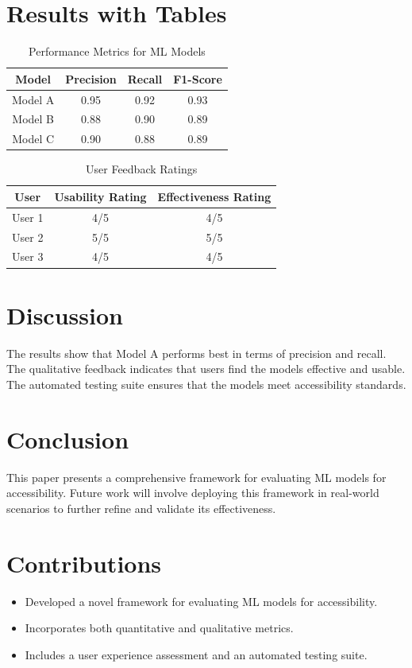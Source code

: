 \documentclass{article}
\begin{document}
\section{Results with Tables}
\begin{table}[ht]
    \centering
    \begin{tabular}{|c|c|c|c|}
        \hline
        Model & Precision & Recall & F1-Score \\
        \hline
        Model A & 0.95 & 0.92 & 0.93 \\
        Model B & 0.88 & 0.90 & 0.89 \\
        Model C & 0.90 & 0.88 & 0.89 \\
        \hline
    \end{tabular}
    \caption{Performance Metrics for ML Models}
    \label{tab:metrics}
\end{table}

\begin{table}[ht]
    \centering
    \begin{tabular}{|c|c|c|}
        \hline
        User & Usability Rating & Effectiveness Rating \\
        \hline
        User 1 & 4/5 & 4/5 \\
        User 2 & 5/5 & 5/5 \\
        User 3 & 4/5 & 4/5 \\
        \hline
    \end{tabular}
    \caption{User Feedback Ratings}
    \label{tab:userfeedback}
\end{table}

\section{Discussion}
The results show that Model A performs best in terms of precision and recall. The qualitative feedback indicates that users find the models effective and usable. The automated testing suite ensures that the models meet accessibility standards.

\section{Conclusion}
This paper presents a comprehensive framework for evaluating ML models for accessibility. Future work will involve deploying this framework in real-world scenarios to further refine and validate its effectiveness.

\section{Contributions}
\begin{itemize}
    \item Developed a novel framework for evaluating ML models for accessibility.
    \item Incorporates both quantitative and qualitative metrics.
    \item Includes a user experience assessment and an automated testing suite.
\end{itemize}
\end{document}

